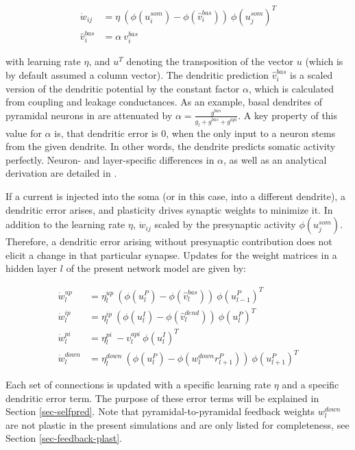 \begin{align}
  \dot{w}_{ij}    & = \eta \ ( \phi(u_i^{som}) - \phi(\hat{v}_i^{bas}) ) \ \phi(u_j^{som})^T \\
  \hat{v}_i^{bas} & = \alpha \  v_i^{bas}
\end{align}

with learning rate $\eta$, and $u^T$ denoting the transposition of the vector $u$ (which is by default assumed a column
vector). The dendritic prediction $\hat{v}_i^{bas}$ is a scaled version of the dendritic potential by the constant
factor $\alpha$, which is calculated from coupling and leakage conductances. As an example, basal dendrites of pyramidal
neurons in \cite{sacramento2018dendritic} are attenuated by $\alpha = \frac{g^{bas}}{g_l + g^{bas} + g^{api}}$. A key
property of this value for $\alpha$ is, that dendritic error is $0$, when the only input to a neuron stems from the
given dendrite. In other words, the dendrite predicts somatic activity perfectly. Neuron- and layer-specific differences
in $\alpha$, as well as an analytical derivation are detailed in \citep{sacramento2018dendritic}.

If a current is injected into the soma (or in this case, into a different dendrite), a dendritic error arises, and
plasticity drives synaptic weights to minimize it. In addition to the learning rate $\eta$, $\dot{w}_{ij}$ scaled by the
presynaptic activity $\phi(u_j^{som})$. Therefore, a dendritic error arising without presynaptic contribution does not
elicit a change in that particular synapse.  
Updates for the weight matrices in a hidden layer $l$ of the present network model are given by:

\begin{align}
  \dot{w}_{l}^{up}   & = \eta_l^{up} \ ( \phi(u_l^{P}) - \phi(\hat{v}_l^{bas}) ) \ \phi(u_{l-1}^{P})^T\label{eq-delta_w_up}         \\
  \dot{w}_{l}^{ip}   & = \eta_l^{ip} \ ( \phi(u_l^{I}) - \phi(\hat{v}_l^{dend}) ) \ \phi(u_{l}^{P})^T\label{eq-delta_w_ip}          \\
  \dot{w}_{l}^{pi}   & = \eta_l^{pi} \ - v_l^{api} \ \phi(u_l^{I})^T\label{eq-delta_w_pi}                                           \\
  \dot{w}_{l}^{down} & = \eta_l^{down} \ ( \phi(u_l^{P}) - \phi(w_l^{down} r_{l+1}^P) )\ \phi(u_{l+1}^{P})^T\label{eq-delta_w_down}
\end{align}

Each set of connections is updated with a specific learning rate $\eta$ and a specific dendritic error term. The purpose
of these error terms will be explained in Section \ref{sec-selfpred}. Note that pyramidal-to-pyramidal feedback weights
$w_l^{down}$ are not plastic in the present simulations and are only listed for completeness, see Section
\ref{sec-feedback-plast}.


